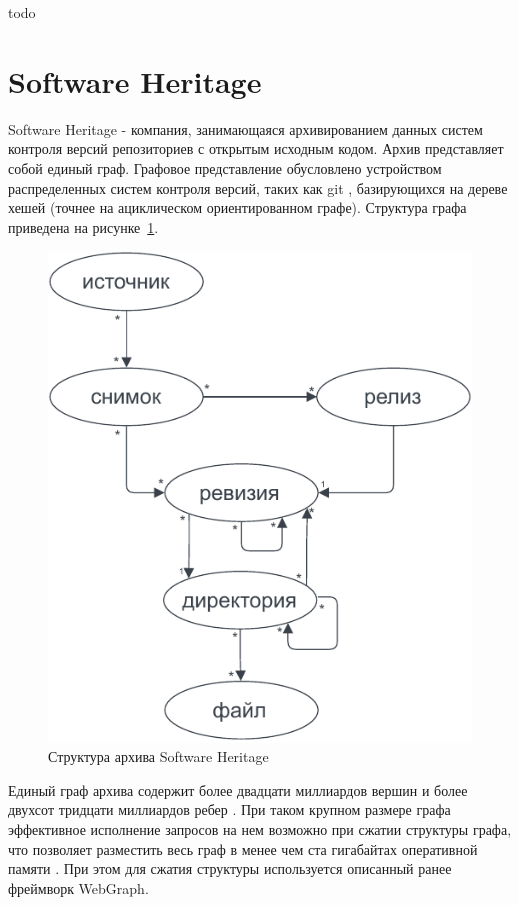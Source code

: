 \documentclass[times,specification,annotation]{itmo-student-thesis}
\begin{document}
todo

\section{Software Heritage}

Software Heritage - компания, занимающаяся архивированием данных систем контроля версий репозиториев с открытым исходным кодом. Архив представляет собой единый граф. Графовое представление обусловлено устройством распределенных систем контроля версий, таких как git \cite{git}, базирующихся на дереве хешей (точнее на ациклическом ориентированном графе). Структура графа приведена на рисунке~\ref{fig1}.

\begin{figure}[!h]
\caption{Структура архива Software Heritage}\label{fig1}
\centering
\includegraphics{img/swh-graph-structure.pdf}
\end{figure}

Единый граф архива содержит более двадцати миллиардов вершин и более двухсот тридцати миллиардов ребер \cite{swh-dataset}. При таком крупном размере графа эффективное исполнение запросов на нем возможно при сжатии структуры графа, что позволяет разместить весь граф в менее чем ста гигабайтах оперативной памяти \cite{saner}. При этом для сжатия структуры используется описанный ранее фреймворк WebGraph.
\end{document}
